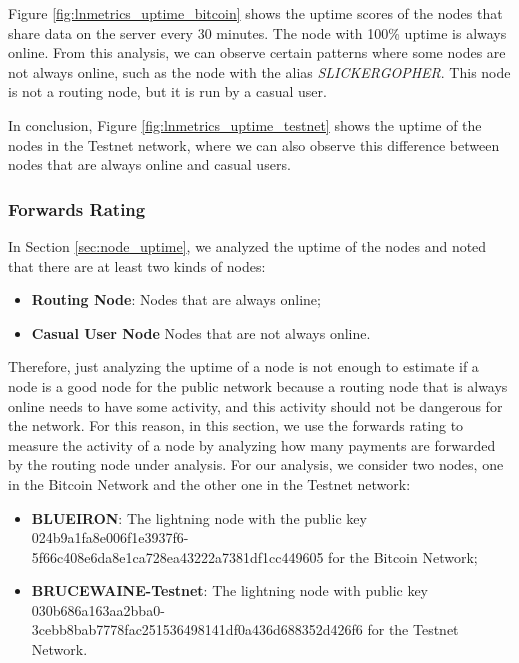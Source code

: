 Figure \ref{fig:lnmetrics_uptime_bitcoin} shows the uptime scores of the nodes that share data on 
the server every 30 minutes. The node with 100\% uptime is always online. From this analysis, we can 
observe certain patterns where some nodes are not always online, such as the node with the 
alias \emph{SLICKERGOPHER}. This node is not a routing node, but it is run by a casual user.

In conclusion, Figure \ref{fig:lnmetrics_uptime_testnet} shows the uptime of the nodes 
in the Testnet network, where we can also observe this difference between nodes that 
are always online and casual users.

\subsubsection{Forwards Rating}
\label{sec:forwards_rating}

In Section \ref{sec:node_uptime}, we analyzed the uptime of the nodes 
and noted that there are at least two kinds of nodes:

\begin{itemize}
    \item {\bf Routing Node}: Nodes that are always online;
    \item {\bf Casual User Node} Nodes that are not always online.
\end{itemize}

Therefore, just analyzing the uptime of a node is not enough to estimate if a node is a 
good node for the public network because a routing node that is always online needs to 
have some activity, and this activity should not be dangerous for the network.
For this reason, in this section, we use the forwards rating to measure the activity of 
a node by analyzing how many payments are forwarded by the routing node under analysis. 
For our analysis, we consider two nodes, one in the Bitcoin Network and the other 
one in the Testnet network:

\begin{itemize}
    \item {\bf BLUEIRON}: The lightning node with the public key 024b9a1fa8e006f1e3937f6-\\5f66c408e6da8e1ca728ea43222a7381df1cc449605 for the Bitcoin Network;
    \item {\bf BRUCEWAINE-Testnet}: The lightning node with public key 030b686a163aa2bba0-\\3cebb8bab7778fac251536498141df0a436d688352d426f6 for the Testnet Network.
\end{itemize}


